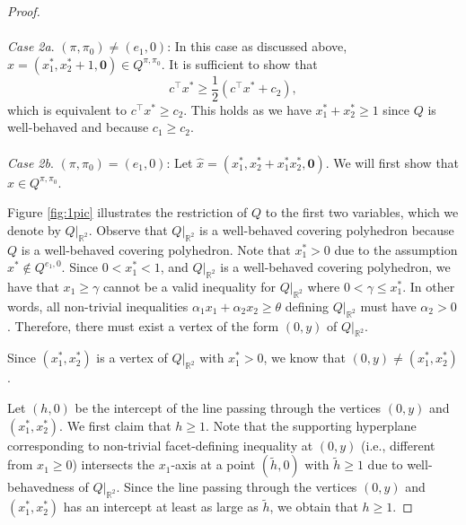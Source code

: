 \documentclass[11pt]{article}
\newcommand{\R}{\mathbb{R}}
\newcommand{\zeros}{\boldsymbol{0}}
\newcommand{\cred}{\color{black}}
\begin{document}
\begin{proof}
 \\ \\	
\emph{Case 2a}. $(\pi,\pi_0) \neq (e_1,0)$: {\cred In this case as discussed above}, {\cred $\hat{x} = (x^*_1,x^*_2 + 1,\zeros) \in Q^{\pi,\pi_0}$}. It is sufficient to show that 
$$c^\top x^* \geq \frac{1}{2} (c^\top x^* + c_2),$$ 
which is equivalent to $c^\top x^* \geq c_2$.
This holds as we have $x^*_1+x^*_2 \geq 1$ since $Q$ is well-behaved {\cred and because $c_1 \geq c_2$}.
 \\ \\
\emph{Case 2b}. $(\pi,\pi_0) = (e_1,0)$: Let $\hat{x} = (x^*_1,x^*_2 + x^*_1 x^*_2,\zeros)$. We will first show that $\hat{x} \in Q^{\pi,\pi_0}$.

Figure \ref{fig:1pic} illustrates the restriction of $Q$ to the first two variables, which we denote by $Q |_{\R^2}$. Observe that $Q |_{\R^2}$ is a well-behaved covering polyhedron 
because $Q$ is a well-behaved covering polyhedron.  Note that $x_1^* > 0$ due to the assumption $x^* \notin Q^{e_1,0}$.
{\cred Since $0 < x^*_1 < 1$, and $Q |_{\R^2}$ is a well-behaved covering polyhedron, we  have that $x_1 \geq  \gamma$ cannot be a valid inequality for $Q |_{\R^2}$ where $0< \gamma \leq x^*_1$. In other words, all non-trivial inequalities $\alpha_1 x_1 + \alpha_2 x_2 \geq \theta$ defining $Q |_{\R^2}$ must have $\alpha_2 > 0$.  Therefore, there must exist a vertex of the form $(0,y)$ of $Q |_{\R^2}$.}

Since $(x^*_1,x^*_2)$ is a vertex of $Q |_{\R^2}$ {\cred with $x_1^* > 0$}, we know that $(0,y) \neq (x^*_1,x^*_2)$. 

Let $(h,0)$ be the intercept of the line passing through the vertices $(0,y) $ and $(x^*_1,x^*_2)$.  {\cred We first claim that $h \geq 1$. Note that the supporting hyperplane corresponding to non-trivial facet-defining inequality at $(0, y)$ (i.e., different from $x_1 \geq 0$) intersects the $x_1$-axis at a point $(\tilde{h}, 0)$ with $\tilde{h} \geq 1$ due to well-behavedness of $Q |_{\R^2}$. Since the line passing through the vertices $(0,y) $ and $(x^*_1,x^*_2)$ has an intercept at least as large as $\tilde{h}$, we obtain that $h \geq 1$.}


\end{proof}
\end{document}
